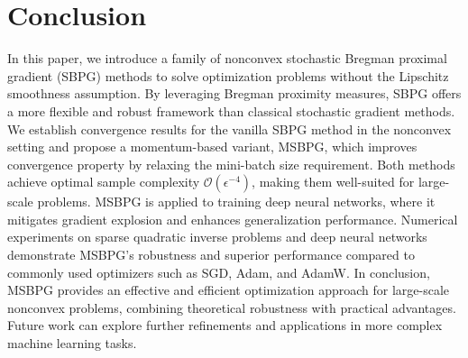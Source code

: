 \documentclass[twoside,11pt]{article}
\begin{document}
\section{Conclusion}\label{section-conclusion}
In this paper, we introduce a family of nonconvex stochastic Bregman proximal gradient (SBPG) methods to solve optimization problems without the Lipschitz smoothness assumption. By leveraging Bregman proximity measures, SBPG offers a more flexible and robust framework than classical stochastic gradient methods. We establish convergence results for the vanilla SBPG method in the nonconvex setting and propose a momentum-based variant, MSBPG, which improves convergence property by relaxing the mini-batch size requirement. Both methods achieve optimal sample complexity $\mathcal{O}(\epsilon^{-4})$, making them well-suited for large-scale problems. MSBPG is applied to training deep neural networks, where it mitigates gradient explosion and enhances generalization performance. Numerical experiments on sparse quadratic inverse problems and deep neural networks demonstrate MSBPG's robustness and superior performance compared to commonly used optimizers such as SGD, Adam, and AdamW. In conclusion, MSBPG provides an effective and efficient optimization approach for large-scale nonconvex problems, combining theoretical robustness with practical advantages. Future work can explore further refinements and applications in more complex machine learning tasks.

\appendix
\end{document}
